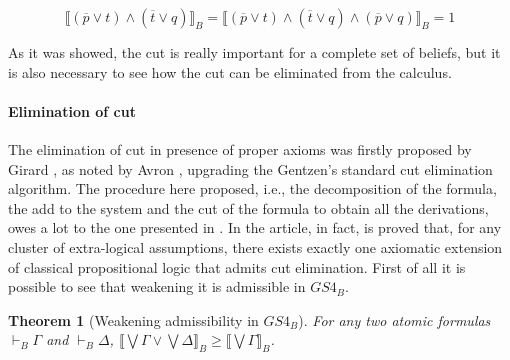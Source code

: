 \documentclass[a4paper, 12pt, oneside]{article}
\theoremstyle{plain}
\newtheorem{theorem}{Theorem}[section]
\theoremstyle{definition}
\begin{document}
$$\llbracket (\overline{p} \vee t) \wedge (\overline{t} \vee q) \rrbracket_B = \llbracket (\overline{p} \vee t) \wedge (\overline{t} \vee q) \wedge (\overline{p} \vee q) \rrbracket_B = 1$$

As it was showed, the cut is really important for a complete set of beliefs, but it is also necessary to see how the cut can be eliminated from the calculus. 

\paragraph{Elimination of cut}

The elimination of cut in presence of proper axioms was firstly proposed by Girard \cite{gir:prooftypes}, as noted by Avron \cite{avron:gentzen}, upgrading the Gentzen's standard cut elimination algorithm. The procedure here proposed, i.e., the decomposition of the formula, the add to the system and the cut of the formula to obtain all the derivations, owes a lot to the one presented in  \cite{piazzapulcini_uniqueness}. In the article, in fact, is proved that, for any cluster of extra-logical assumptions, there exists exactly one axiomatic extension of classical propositional logic that admits cut elimination.  First of all it is possible to see that weakening it is admissible in $GS4_B$.


\begin{theorem}[Weakening admissibility in $GS4_B$]
	\label{th:weakening}
	For any two atomic formulas $\vdash_B \Gamma$ and $\vdash_B \Delta$, $\llbracket \bigvee \Gamma \vee \bigvee \Delta \rrbracket_B \geq \llbracket \bigvee\Gamma \rrbracket_B$.
\end{theorem}
\end{document}
